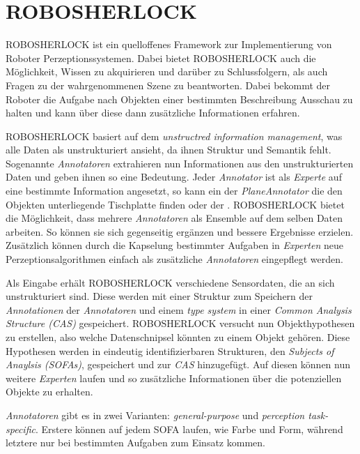 \section{ROBOSHERLOCK}
\label{sec:robosherlock}
ROBOSHERLOCK ist ein quelloffenes Framework zur Implementierung von Roboter Perzeptionssystemen. Dabei bietet ROBOSHERLOCK auch die Möglichkeit, Wissen zu akquirieren und darüber zu Schlussfolgern, als auch Fragen zu der wahrgenommenen Szene zu beantworten. Dabei bekommt der Roboter die Aufgabe nach Objekten einer bestimmten Beschreibung Ausschau zu halten und kann über diese dann zusätzliche Informationen erfahren. \par
ROBOSHERLOCK basiert auf dem \textit{unstructred information management}, was alle Daten als unstrukturiert ansieht, da ihnen Struktur und Semantik fehlt. Sogenannte \textit{Annotatoren} extrahieren nun Informationen aus den unstrukturierten Daten und geben ihnen so eine Bedeutung. Jeder \textit{Annotator} ist als \textit{Experte} auf eine bestimmte Information angesetzt, so kann ein der \textit{PlaneAnnotator} die den Objekten unterliegende Tischplatte finden oder der . ROBOSHERLOCK bietet die Möglichkeit, dass mehrere \textit{Annotatoren} als Ensemble auf dem selben Daten arbeiten. So können sie sich gegenseitig ergänzen  und bessere Ergebnisse erzielen. Zusätzlich können durch die Kapselung bestimmter Aufgaben in \textit{Experten} neue Perzeptionsalgorithmen einfach als zusätzliche \textit{Annotatoren} eingepflegt werden. \par 
Als Eingabe erhält ROBOSHERLOCK verschiedene Sensordaten, die an sich unstrukturiert sind. Diese werden mit einer Struktur zum Speichern der \textit{Annotationen} der \textit{Annotatoren} und einem \textit{type system} in einer \textit{Common Analysis Structure (CAS)} gespeichert. ROBOSHERLOCK versucht nun Objekthypothesen zu erstellen, also welche Datenschnipsel könnten zu einem Objekt gehören. Diese Hypothesen werden in eindeutig identifizierbaren Strukturen, den \textit{Subjects of Anaylsis (SOFAs)}, gespeichert und zur \textit{CAS} hinzugefügt. Auf diesen können nun weitere \textit{Experten} laufen und so zusätzliche Informationen über die potenziellen Objekte zu erhalten. \par
\textit{Annotatoren} gibt es in zwei Varianten: \textit{general-purpose} und \textit{perception task-specific}. Erstere können auf jedem SOFA laufen, wie Farbe und Form, während letztere nur bei bestimmten Aufgaben zum Einsatz kommen. \newline
